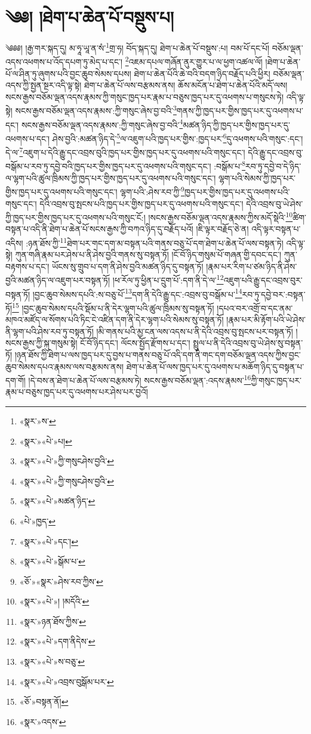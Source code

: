\chapter{༄༅། །ཐེག་པ་ཆེན་པོ་བསྡུས་པ།}༄༅༅། །རྒྱ་གར་སྐད་དུ། མ་ཧཱ་ཡཱ་ན་སཾ་\footnote{«སྣར་»ས་}གྲ་ཧ། བོད་སྐད་དུ། ཐེག་པ་ཆེན་པོ་བསྡུས་:པ། བམ་པོ་དང་པོ། བཅོམ་ལྡན་འདས་འཕགས་པ་འོད་དཔག་ཏུ་མེད་པ་དང་། \footnote{«སྣར་»«པེ་»པ།  }འཇམ་དཔལ་གཞོན་ནུར་གྱུར་པ་ལ་ཕྱག་འཚལ་ལོ། །ཐེག་པ་ཆེན་པོ་ལ་ཤིན་ཏུ་ཞུགས་པའི་བྱང་ཆུབ་སེམས་དཔས། ཐེག་པ་ཆེན་པོའི་ཆེ་བའི་བདག་ཉིད་བརྗོད་པའི་ཕྱིར། བཅོམ་ལྡན་འདས་ཀྱི་སྤྱན་སྔར་འདི་ལྟ་སྟེ། ཐེག་པ་ཆེན་པོ་ལས་བརྩམས་ནས། ཆོས་མངོན་པ་ཐེག་པ་ཆེན་པོའི་མདོ་ལས། སངས་རྒྱས་བཅོམ་ལྡན་འདས་རྣམས་ཀྱི་གསུང་ཁྱད་པར་རྣམ་པ་བཅུས་ཁྱད་པར་དུ་འཕགས་པ་གསུངས་ཏེ། འདི་ལྟ་སྟེ། སངས་རྒྱས་བཅོམ་ལྡན་འདས་རྣམས་:ཀྱི་གསུང་ཞེས་བྱ་བའི་\footnote{«སྣར་»«པེ་»ཀྱི་གསུངཤེས་བྱའི་}གནས་ཀྱི་ཁྱད་པར་གྱིས་ཁྱད་པར་དུ་འཕགས་པ་དང་། སངས་རྒྱས་བཅོམ་ལྡན་འདས་རྣམས་:ཀྱི་གསུང་ཞེས་བྱ་བའི་\footnote{«སྣར་»«པེ་»ཀྱི་གསུངཤེས་བྱའི་}མཚན་ཉིད་ཀྱི་ཁྱད་པར་གྱིས་ཁྱད་པར་དུ་འཕགས་པ་དང་། ཤེས་བྱའི་:མཚན་ཉིད་དེ་\footnote{«སྣར་»«པེ་»མཚན་ཉིད་}ལ་འཇུག་པའི་ཁྱད་པར་གྱིས་:ཁྱད་པར་\footnote{«པེ་»ཁྱད་}དུ་འཕགས་པའི་གསུང་:དང་།དེ་ལ་\footnote{«སྣར་»«པེ་»དང་།}འཇུག་པ་དེའི་རྒྱུ་དང་འབྲས་བུའི་ཁྱད་པར་གྱིས་ཁྱད་པར་དུ་འཕགས་པའི་གསུང་དང་། དེའི་རྒྱུ་དང་འབྲས་བུ་བསྒོམ་པ་རབ་ཏུ་དབྱེ་བའི་ཁྱད་པར་གྱིས་ཁྱད་པར་དུ་འཕགས་པའི་གསུང་དང་། :བསྒོམ་པ་\footnote{«སྣར་»«པེ་»སྒོམ་པ་}རབ་ཏུ་དབྱེ་བ་དེ་ཉིད་ལ་ལྷག་པའི་ཚུལ་ཁྲིམས་ཀྱི་ཁྱད་པར་གྱིས་ཁྱད་པར་དུ་འཕགས་པའི་གསུང་དང་། ལྷག་པའི་སེམས་ཀྱི་ཁྱད་པར་གྱིས་ཁྱད་པར་དུ་འཕགས་པའི་གསུང་དང་། ལྷག་པའི་:ཤེས་རབ་ཀྱི་\footnote{«ཅོ་»«སྣར་»ཤེས་རབ་ཀྱིས་}ཁྱད་པར་གྱིས་ཁྱད་པར་དུ་འཕགས་པའི་གསུང་དང་། དེའི་འབྲས་བུ་སྤངས་པའི་ཁྱད་པར་གྱིས་ཁྱད་པར་དུ་འཕགས་པའི་གསུང་དང་། དེའི་འབྲས་བུ་ཡེ་ཤེས་ཀྱི་ཁྱད་པར་གྱིས་ཁྱད་པར་དུ་འཕགས་པའི་གསུང་ངོ:། །སངས་རྒྱས་བཅོམ་ལྡན་འདས་རྣམས་ཀྱིས་མདོ་སྡེའི་\footnote{«སྣར་»«པེ་»། །མདོའི་}ཚིག་བསྟན་པ་འདི་ནི་ཐེག་པ་ཆེན་པོ་སངས་རྒྱས་ཀྱི་བཀའ་ཉིད་དུ་བརྗོད་པའོ། །ཇི་ལྟར་བརྗོད་ཅེ་ན། འདི་ལྟར་བསྟན་པ་འདིས། :ཉན་ཐོས་ཀྱི་\footnote{«སྣར་»ཉན་ཐོས་ཀྱིས་}ཐེག་པར་གང་དག་མ་བསྟན་པའི་གནས་བཅུ་པོ་དག་ཐེག་པ་ཆེན་པོ་ལས་བསྟན་ཏེ། འདི་ལྟ་སྟེ། ཀུན་གཞི་རྣམ་པར་ཤེས་པ་ནི་ཤེས་བྱའི་གནས་སུ་བསྟན་ཏོ། །ངོ་བོ་ཉིད་གསུམ་པོ་གཞན་གྱི་དབང་དང་། ཀུན་བརྟགས་པ་དང་། ཡོངས་སུ་གྲུབ་པ་དག་ནི་ཤེས་བྱའི་མཚན་ཉིད་དུ་བསྟན་ཏོ། །རྣམ་པར་རིག་པ་ཙམ་ཉིད་ནི་ཤེས་བྱའི་མཚན་ཉིད་ལ་འཇུག་པར་བསྟན་ཏོ། །ཕ་རོལ་ཏུ་ཕྱིན་པ་དྲུག་པོ་:དག་ནི་དེ་ལ་\footnote{«སྣར་»«པེ་»དག་ནིདེས་}འཇུག་པའི་རྒྱུ་དང་འབྲས་བུར་བསྟན་ཏོ། །བྱང་ཆུབ་སེམས་དཔའི་:ས་བཅུ་པོ་\footnote{«སྣར་»«པེ་»ས་བཅུ་}དག་ནི་དེའི་རྒྱུ་དང་:འབྲས་བུ་བསྒོམ་པ་\footnote{«སྣར་»«པེ་»འབྲས་བུསྒོམ་པར་}རབ་ཏུ་དབྱེ་བར་:བསྟན་ཏོ།\footnote{«ཅོ་»བསྟན་ནོ།} །བྱང་ཆུབ་སེམས་དཔའི་སྡོམ་པ་ནི་དེར་ལྷག་པའི་ཚུལ་ཁྲིམས་སུ་བསྟན་ཏོ། །དཔའ་བར་འགྲོ་བ་དང་ནམ་མཁའ་མཛོད་ལ་སོགས་པའི་ཏིང་ངེ་འཛིན་དག་ནི་དེར་ལྷག་པའི་སེམས་སུ་བསྟན་ཏོ། །རྣམ་པར་མི་རྟོག་པའི་ཡེ་ཤེས་ནི་ལྷག་པའི་ཤེས་རབ་ཏུ་བསྟན་ཏོ། །མི་གནས་པའི་མྱ་ངན་ལས་འདས་པ་ནི་དེའི་འབྲས་བུ་སྤངས་པར་བསྟན་ཏོ། །སངས་རྒྱས་ཀྱི་སྐུ་གསུམ་སྟེ། ངོ་བོ་ཉིད་དང་། ལོངས་སྤྱོད་རྫོགས་པ་དང་། སྤྲུལ་པ་ནི་དེའི་འབྲས་བུ་ཡེ་ཤེས་སུ་བསྟན་ཏོ། །ཉན་ཐོས་ཀྱི་ཐེག་པ་ལས་ཁྱད་པར་དུ་བྱས་པ་གནས་བཅུ་པོ་འདི་དག་ནི་གང་དག་བཅོམ་ལྡན་འདས་ཀྱིས་བྱང་ཆུབ་སེམས་དཔའ་རྣམས་ལས་བརྩམས་ནས། ཐེག་པ་ཆེན་པོ་ལས་ཁྱད་པར་དུ་འཕགས་པ་མཆོག་ཉིད་དུ་བསྟན་པ་དག་གོ། །དེ་བས་ན་ཐེག་པ་ཆེན་པོ་ལས་བརྩམས་ཏེ། སངས་རྒྱས་བཅོམ་ལྡན་:འདས་རྣམས་\footnote{«སྣར་»འདས་}ཀྱི་གསུང་ཁྱད་པར་རྣམ་པ་བཅུས་ཁྱད་པར་དུ་འཕགས་པར་ཤེས་པར་བྱའོ། 